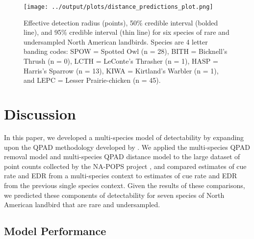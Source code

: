 \documentclass[12pt]{article}
\begin{document}
\begin{figure}[h!]
	\texttt{[image: ../output/plots/distance\_predictions\_plot.png]}
	\caption{Effective detection radius (points), 50\% credible interval (bolded line), and 95\% credible interval (thin line) for six species of rare and undersampled North American landbirds. Species are 4 letter banding codes: SPOW = Spotted Owl (n = 28), BITH = Bicknell's Thrush (n = 0), LCTH = LeConte's Thrasher (n = 1), HASP = Harris's Sparrow (n = 13), KIWA = Kirtland's Warbler (n = 1), and LEPC = Lesser Prairie-chicken (n = 45).}
	\label{fig:distance_predictions}
\end{figure}

\section{Discussion}

\par In this paper, we developed a multi-species model of detectability by expanding upon the QPAD methodology developed by \citet{solymos_calibrating_2013}.
We applied the multi-species QPAD removal model and multi-species QPAD distance model to the large dataset of point counts collected by the NA-POPS project \citep{edwards_point_2023}, and compared estimates of cue rate and EDR from a multi-species context to estimates of cue rate and EDR from the previous single species context.
Given the results of these comparisons, we predicted these components of detectability for seven species of North American landbird that are rare and undersampled.

\subsection{Model Performance}
\end{document}
